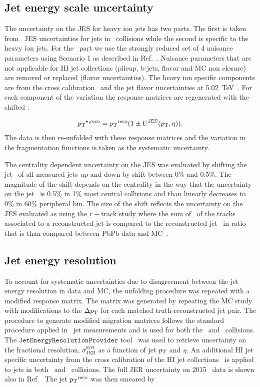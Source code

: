 \subsection{Jet energy scale uncertainty}

The uncertainty on the JES for heavy ion jets has two parts.
The first is taken from \pp\ JES uncertainties for jets in \pp\ collisions while the second is specific to the heavy ion jets.
For the \pp\ part we use the strongly reduced set of 4 nuisance parameters using Scenario 1 as described in Ref.~\cite{JESuncertaintytwiki}.
Nuisance parameters that are not applicable for HI jet collections (pileup, b-jets, flavor and MC non closure) are removed or replaced (flavor uncertainties).
The heavy ion specific components are from the cross calibration~\cite{cc2015} and the jet flavor uncertainties at 5.02~TeV~\cite{2015392}.
For each component of the variation the response matrices are regenerated with the shifted \ptjet:

\begin{equation}
\mbox{$p_{\mathrm{T}}$}^{\star,\mathrm{reco}} = \mbox{$p_{\mathrm{T}}$}^{\mathrm{reco}} (1\pm U^{\mathrm{JES}}(\mbox{$p_{\mathrm{T}}$} , \eta)).
\end{equation}
The data is then re-unfolded with these response matrices and the variation in the fragmentation functions is taken as the systematic uncertainty.

The centrality dependent uncertainty on the JES was evaluated by shifting the jet \pt\ of all measured jets up and down by shift between 0\% and 0.5\%.
The magnitude of the shift depends on the centrality in the way that the uncertainty on the jet \pt\ is 0.5\% in 1\% most central collisions and than linearly decreases to 0\% in 60\% peripheral bin.
The size of the shift reflects the uncertainty on the JES evaluated as using the $r-$track study where the sum of \pT\ of the tracks associated to a reconstructed jet is compared to the reconstructed jet \pT\ in ratio that is than compared between PbPb data and MC~\cite{HIjesnote,Aad:2014bxa}.



\subsection{Jet energy resolution}
To account for systematic uncertainties due to disagreement between the jet energy resolution in data and MC, the unfolding procedure was repeated with a modified response matrix.
The matrix was generated by repeating the MC study with modifications to the $\Delta \mbox{$p_{\mathrm{T}}$}$ for each matched truth-reconstructed jet pair.
The procedure to generate modified migration matrices follows the standard procedure applied in \pp\ jet measurements and is used for both the \pp\ and \pbpb\ collisions.
The $\texttt{JetEnergyResolutionProvider}$ tool~\cite{JERUncertaintyProviderRun2} was used to retrieve uncertainty on the fractional resolution, $\sigma^{\mathrm{syst}}_{\mathrm{JER}}$ as a function of jet $\mbox{$p_{\mathrm{T}}$}$ and $\eta$.
An additional HI jet specific uncertainty from the cross calibration of the HI jet collections~\cite{cc2015} is applied to jets in both \pp\ and \pbpb\ collisions.
The full JER uncertainty on 2015 \pp\ data is shown also in Ref.~\cite{Aad:1696485}
The jet $\mbox{$p_{\mathrm{T}}$}^{\mathrm{reco}}$ was then smeared by

